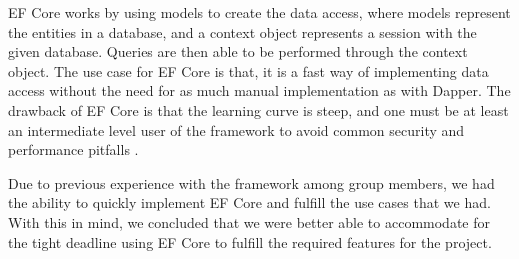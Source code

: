 EF Core works by using models to create the data access, where models represent the entities in a database, and a context object represents a session with the given database. 
Queries are then able to be performed through the context object. 
The use case for EF Core is that, it is a fast way of implementing data access without the need for as much manual implementation as with Dapper. 
The drawback of EF Core is that the learning curve is steep, and one must be at least an intermediate level user of the framework to avoid common security and performance pitfalls \cite{EFCore}.

Due to previous experience with the framework among group members, we had the ability to quickly implement EF Core and fulfill the use cases that we had.
With this in mind, we concluded that we were better able to accommodate for the tight deadline using EF Core to fulfill the required features for the \knox{} project.
